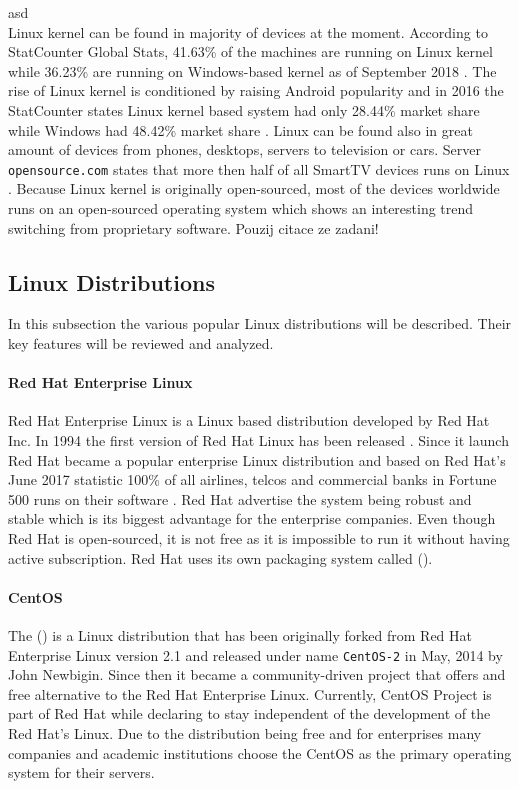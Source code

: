 asd\\
Linux kernel can be found in majority of devices at the moment. According to StatCounter Global Stats, 41.63\% of the machines are running on Linux kernel while 36.23\% are running on Windows-based kernel as of September 2018 \cite{StatCounter}. The rise of Linux kernel is conditioned by raising Android popularity and in 2016 the StatCounter states Linux kernel based system had only 28.44\% market share while Windows had 48.42\% market share \cite{StatCounter}. Linux can be found also in great amount of devices from phones, desktops, servers to television or cars. Server \texttt{opensource.com} states that more then half of all SmartTV devices runs on Linux \cite{opensourcecom}. Because Linux kernel is originally open-sourced, most of the devices worldwide runs on an open-sourced operating system which shows an interesting trend switching from proprietary software.
Pouzij citace ze zadani!
\subsection{Linux Distributions}
\label{subsection:linuxdistros}
In this subsection the various popular Linux distributions will be described. Their key features will be reviewed and analyzed. 
\paragraph{Red Hat Enterprise Linux}
Red Hat Enterprise Linux is a Linux based distribution developed by Red Hat Inc. In 1994 the first version of Red Hat Linux has been released \cite{rhhistory}. Since it launch Red Hat became a popular enterprise Linux distribution and based on Red Hat's June 2017 statistic 100\% of all airlines, telcos and commercial banks in Fortune 500 runs on their software \cite{rhtrusted}. Red Hat advertise the system being robust and stable which is its biggest advantage for the enterprise companies. Even though Red Hat is open-sourced, it is not free as it is impossible to run it without having active subscription. Red Hat uses its own packaging system called  ().
\paragraph{CentOS}
The  () is a Linux distribution that has been originally forked from Red Hat Enterprise Linux version 2.1 and released under name \texttt{CentOS-2} in May, 2014 \cite{centosfirsts} by John Newbigin. Since then it became a community-driven project that offers and free alternative to the Red Hat Enterprise Linux. Currently, CentOS Project is part of Red Hat while declaring to stay independent of the development of the Red Hat's Linux. Due to the distribution being free and for enterprises many companies and academic institutions choose the CentOS as the primary operating system for their servers.
